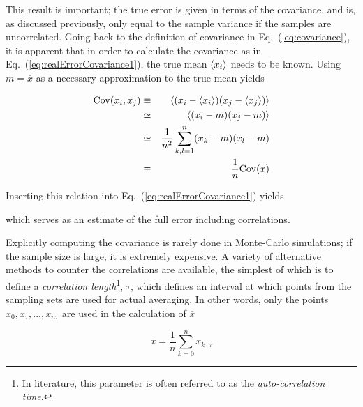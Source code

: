 This result is important; the true error is given in terms of the covariance, and is, as discussed previously, only equal to the sample variance if the samples are uncorrelated. Going back to the definition of covariance in Eq.~(\ref{eq:covariance}), it is apparent that in order to calculate the covariance as in Eq.~(\ref{eq:realErrorCovariance1}), the true mean $\left< x_i \right>$ needs to be known. Using $m=\overline{x}$ as a necessary approximation to the true mean yields   

\begin{eqnarray}
 \mathrm{Cov}(x_i, x_j) &\equiv& \left< (x_i - \left< x_i \right>)(x_j - \left< x_j \right>) \right> \nonumber\\
                &\simeq& \left< (x_i - m)(x_j - m) \right> \nonumber\\
                &\simeq& \frac{1}{n^2}\sum_{k,l=1}^n (x_k-m)(x_l-m) \\
                &\equiv& \frac{1}{n}\mathrm{Cov}(x)
\end{eqnarray}

Inserting this relation into Eq.~(\ref{eq:realErrorCovariance1}) yields


which serves as an estimate of the full error including correlations. 

Explicitly computing the covariance is rarely done in Monte-Carlo simulations; if the sample size is large, it is extremely expensive. A variety of alternative methods to counter the correlations are available, the simplest of which is to define a \textit{correlation length}\footnote{In literature, this parameter is often referred to as the \textit{auto-correlation time}.}, $\tau$, which defines an interval at which points from the sampling sets are used for actual averaging. In other words, only the points $x_0, x_{\tau}, ..., x_{n\tau}$ are used in the calculation of $\overline{x}$

\begin{equation}
 \overline{x} = \frac{1}{n}\sum_{k=0}^n x_{k\cdot\tau}
\end{equation}

